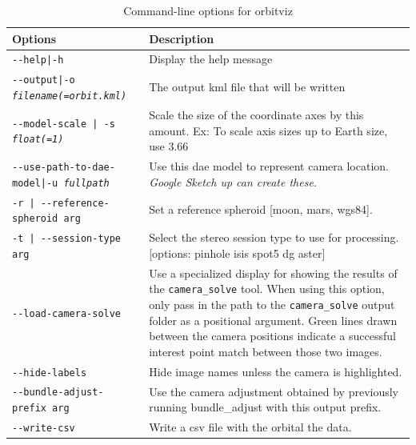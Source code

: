 \begin{longtable}{|l|p{10cm}|}
\caption{Command-line options for orbitviz}
\label{tbl:orbitviz}
\endfirsthead
\endhead
\endfoot
\endlastfoot
\hline
Options & Description \\ \hline \hline
\texttt{-\/-help|-h} & Display the help message\\ \hline

\texttt{-\/-output|-o \textit{filename(=orbit.kml)}} & The output kml file that will be written \\ \hline

\texttt{-\/-model-scale | -s \textit{float(=1)}} & Scale the size of the coordinate axes by this amount. Ex: To scale axis sizes up to Earth size, use 3.66 \\ \hline

\texttt{-\/-use-path-to-dae-model|-u \textit{fullpath}} & Use this dae model to represent camera location. \emph{Google Sketch up can create these.} \\ \hline

\texttt{-r | -\/-reference-spheroid arg} & Set a reference spheroid [moon, mars, wgs84].\\ \hline

\texttt{-t | -\/-session-type  arg} & Select the stereo session type to use for processing. [options: pinhole isis spot5 dg aster]\\ \hline

\texttt{-\/-load-camera-solve} & Use a specialized display for showing the results of the \texttt{camera\_solve} tool.
When using this option, only pass in the path to the \texttt{camera\_solve} output folder as a positional argument.
Green lines drawn between the camera positions indicate a successful interest point match between those two images.\\ \hline

\texttt{-\/-hide-labels} & Hide image names unless the camera is highlighted.\\ \hline

\texttt{-\/-bundle-adjust-prefix arg} & Use the camera adjustment obtained by previously running bundle\_adjust with this output prefix.\\ \hline

\texttt{-\/-write-csv} & Write a csv file with the orbital the data.\\ \hline

\end{longtable}

\clearpage

